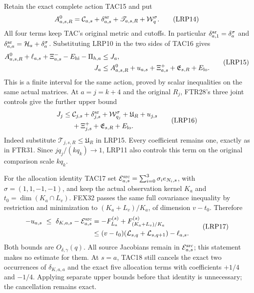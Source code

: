 \documentclass[11pt,a4paper]{article}
\begin{document}
Retain the exact complete action TAC15 and put
\[
 A^0_{a,s,R}=\mathcal C_{a,s}+\delta_{a,s}^{\rm ar}
            +\mathscr T_{a,s,R}+\mathcal W_q^\sigma.
 \tag{LRP14}
\]
All four terms keep TAC's original metric and cutoffs. In particular
$\delta_{a,1}^{\rm ar}=\delta_a^\sigma$ and
$\delta_{a,a}^{\rm ar}=\mathcal H_a+\delta_a^\sigma$.
Substituting LRP10 in the two sides of TAC16 gives
\[
\begin{split}
 A^0_{a,s,R}+\ell_{a,s}+\Xi^-_{a,s}-E_{\rm hi}-\Pi_{h,a}
       &\le J_a,\\
 J_a&\le A^0_{a,s,R}+u_{a,s}+\Xi^+_{a,s}
                   +\mathfrak E_{s,R}+E_{\rm lo}.
\end{split}\tag{LRP15}
\]
This is a finite interval for the same action, proved by scalar
inequalities on the same actual matrices. At $a=j=k+4$ and the
original $R_j$, FTR28's three joint controls give the further upper bound
\[
\begin{split}
 J_j\le{}&\mathcal C_{j,s}+\delta_{j,s}^{\rm ar}
          +\mathcal W_{q_j}^{\sigma}+\mathfrak U_R+u_{j,s}\\
         &+\Xi^+_{j,s}+\mathfrak E_{s,R}+E_{\rm lo}.
\end{split}\tag{LRP16}
\]
Indeed substitute $\mathscr T_{j,s,R}\le\mathfrak U_R$ in LRP15.
Every coefficient remains one, exactly as in FTR31.
Since $jq_j/(kq_k)\to1$, LRP11 also controls this term on the
original comparison scale $kq_k$.

For the allocation identity TAC17 set
$\mathcal E_{a,s}^{\rm src}=\sum_{i=0}^3\sigma_i e_{N_i,s}$,
with $\sigma=(1,1,-1,-1)$, and keep the actual observation kernel
$K_a$ and $t_0=\dim(K_a\cap L_v)$. FEX32 passes the same full
covariance inequality by restriction and minimization to
$(K_a+L_v)/K_a$, of dimension $v-t_0$. Therefore
\[
\begin{split}
 -u_{a,s}\ \le\
 \delta_{K,a,s}-\mathcal E_{a,s}^{\rm src}
   &=-F_{L_a}^{(s)}+F_{(K_a+L_v)/K_a}^{(s)}\\
   &\le(v-t_0)(\mathcal L_{s,q}+\mathcal L_{s,q+1})-\ell_{a,s}.
\end{split}\tag{LRP17}
\]
Both bounds are $O_{\delta,\gamma}(q)$. All source Jacobians remain
in $\mathcal E_{a,s}^{\rm src}$; this statement makes no estimate
for them. At $s=a$, TAC18 still cancels the exact two occurrences of
$\delta_{K,a,a}$ and the exact five allocation terms with coefficients
$+1/4$ and $-1/4$. Applying separate upper bounds before that identity
is unnecessary; the cancellation remains exact.
\end{document}
